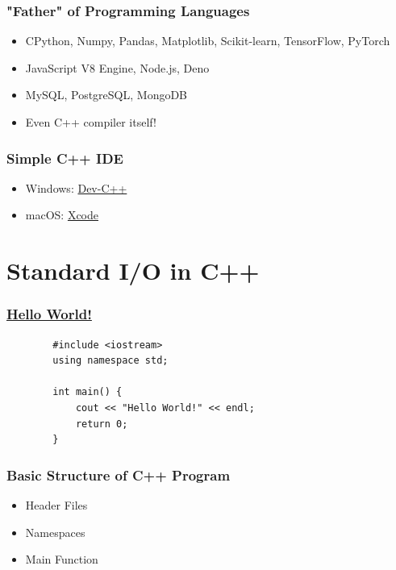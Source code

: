 \documentclass[xcolor=dvipsnames]{beamer}
\begin{document}
    \begin{frame}
        \frametitle{"Father" of Programming Languages}
        \begin{itemize}
            \item CPython, Numpy, Pandas, Matplotlib, Scikit-learn, TensorFlow, PyTorch
            \item JavaScript V8 Engine, Node.js, Deno
            \item MySQL, PostgreSQL, MongoDB
            \item Even C++ compiler itself!
        \end{itemize}
    \end{frame}

    \begin{frame}
        \frametitle{Simple C++ IDE}
        \begin{itemize}
            \item Windows: \href{https://sourceforge.net/projects/orwelldevcpp/}{Dev-C++}
            \item macOS: \href{https://developer.apple.com/xcode/}{Xcode}
        \end{itemize}
    \end{frame}

    \section{Standard I/O in C++}

    \begin{frame}[fragile]
        \frametitle{\href{https://zh.wikipedia.org/zh-tw/Hello_Worldtext}{Hello World!}}
        \begin{verbatim}
        #include <iostream>
        using namespace std;

        int main() {
            cout << "Hello World!" << endl;
            return 0;
        }
        \end{verbatim}
    \end{frame}

    \begin{frame}
        \frametitle{Basic Structure of C++ Program}
        \begin{itemize}
            \item Header Files
            \item Namespaces
            \item Main Function
        \end{itemize}
    \end{frame}
\end{document}
